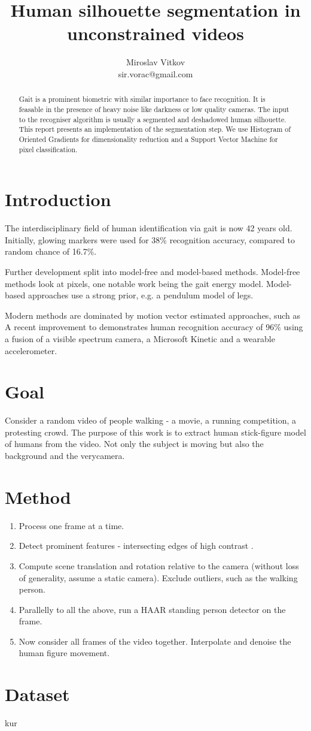 \documentclass{article}
\title{Human silhouette segmentation in unconstrained videos}
\author{Miroslav Vitkov \\ sir.vorac@gmail.com}
\begin{document}
\maketitle


\begin{abstract}
Gait is a prominent biometric with similar importance to face recognition.
It is feasable in the presence of heavy noise like darkness or low quality cameras.
The input to the recogniser algorithm is usually a segmented and deshadowed human silhouette.
This report presents an implementation of the segmentation step.
We use Histogram of Oriented Gradients for dimensionality reduction  and a Support Vector Machine for pixel classification.
\end{abstract}


\section{Introduction}
The interdisciplinary field of human identification via gait is now 42 years old.
Initially, glowing markers were used\cite{begin} for 38\% recognition accuracy, compared to random chance of 16.7\%.

Further development split into model-free and model-based methods.
Model-free methods look at pixels, one notable work being the gait energy model\cite{energy}.
Model-based approaches use a strong prior, e.g. a pendulum model of legs\cite{pendulum}.

Modern methods are dominated by motion vector estimated approaches, such as \cite{pyramid}
A recent improvement to \cite{pyramid} demonstrates human recognition accuracy of 96\% using a fusion of a visible spectrum camera, a Microsoft Kinetic and a wearable accelerometer\cite{robust}.


\section{Goal}
Consider a random video of people walking - a movie, a running competition, a protesting crowd.
The purpose of this work is to extract human stick-figure model of humans from the video.
Not only the subject is moving but also the background and the verycamera.


\section{Method}
\begin{enumerate}
\item{Process one frame at a time.}
\item{Detect prominent features - intersecting edges of high contrast .}
\item{Compute scene translation and rotation relative to the camera (without loss of generality, assume a static camera). Exclude outliers, such as the walking person.}
\item{Parallelly to all the above, run a HAAR standing person detector on the frame.}
\item{Now consider all frames of the video together. Interpolate and denoise the human figure movement.}
\end{enumerate}


\section{Dataset}
kur\cite{largest}


\printbibliography
\end{document}
